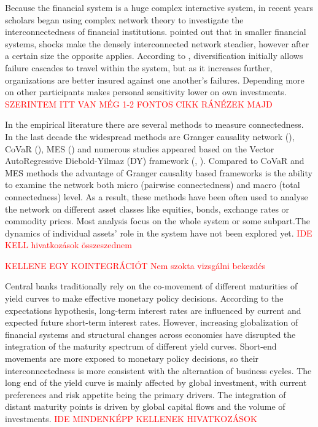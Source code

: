 \documentclass[12pt,bibliography=totoc]{article}
\begin{document}
Because the financial system is a huge complex interactive system, in recent years scholars began using complex network theory to investigate the interconnectedness of financial institutions. \cite{acemoglu2015systemic} pointed out that in smaller financial systems, shocks make the densely interconnected network steadier, however after a certain size the opposite applies. According to \cite{elliott2014financial}, diversification initially allows failure cascades to travel within the system, but as it increases further, organizations are better insured against one another's failures. Depending more on other participants makes personal sensitivity lower on own investments. \textcolor{red}{SZERINTEM ITT VAN MÉG 1-2 FONTOS CIKK RÁNÉZEK MAJD}

In the empirical literature there are several methods to measure connectedness. In the last decade the widespread methods are Granger causality network (\cite{billio2012econometric}), CoVaR (\cite{adrian2008federal}), MES (\cite{acharya2012capital}) and numerous studies appeared based on the Vector AutoRegressive Diebold-Yilmaz (DY) framework (\cite{diebold2009measuring}, \cite{diebold2012better}). Compared to CoVaR and MES methods the advantage of Granger causality based frameworks is the ability to examine the network both micro (pairwise connectedness) and macro (total connectedness) level. As a result, these methods have been often used to analyse the network on different asset classes like equities, bonds, exchange rates or commodity prices. Most analysis focus on the whole system or some subpart.The dynamics of individual assets' role in the system have not been explored yet. \textcolor{red}{IDE KELL hivatkozások összeszednem}

\smallskip{}
\textcolor{red}{KELLENE EGY KOINTEGRÁCIÓT Nem szokta vizsgálni bekezdés}
\smallskip{}

Central banks traditionally rely on the co-movement of different maturities of yield curves to make effective monetary policy decisions. According to the expectations hypothesis, long-term interest rates are influenced by current and expected future short-term interest rates. However, increasing globalization of financial systems and structural changes across economies have disrupted the integration of the maturity spectrum of different yield curves. Short-end movements are more exposed to monetary policy decisions, so their interconnectedness is more consistent with the alternation of business cycles. The long end of the yield curve is mainly affected by global investment, with current preferences and risk appetite being the primary drivers. The integration of distant maturity points is driven by global capital flows and the volume of investments. \textcolor{red}{IDE MINDENKÉPP KELLENEK HIVATKOZÁSOK}
\end{document}
